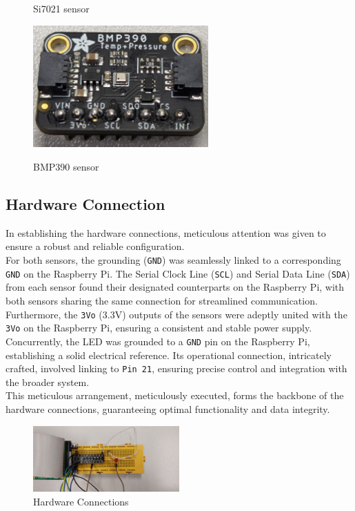 \documentclass[titlepage]{article}
\begin{document}
\begin{figure}[ht]
\begin{minipage}{0.3\textwidth}
        \caption{Si7021 sensor}
        \label{fig:Si7021}
        \vspace{1em}
        \includegraphics[width=0.6\textwidth]{img/BMP390.jpg}
        \caption{BMP390 sensor}
        \label{fig:BMP390}
    \end{minipage}
\end{figure}


\subsection{Hardware Connection}
In establishing the hardware connections, meticulous attention was given to ensure a robust and reliable configuration.\\
For both sensors, the grounding (\texttt{GND}) was seamlessly linked to a corresponding \texttt{GND} on the Raspberry Pi. 
The Serial Clock Line (\texttt{SCL}) and Serial Data Line (\texttt{SDA}) from each sensor found their designated counterparts on the Raspberry Pi, with both sensors sharing the same connection for streamlined communication. 
Furthermore, the \texttt{3Vo} (3.3V) outputs of the sensors were adeptly united with the \texttt{3Vo} on the Raspberry Pi, ensuring a consistent and stable power supply.\\
Concurrently, the LED was grounded to a \texttt{GND} pin on the Raspberry Pi, establishing a solid electrical reference. 
Its operational connection, intricately crafted, involved linking to \texttt{Pin 21}, ensuring precise control and integration with the broader system.\\
This meticulous arrangement, meticulously executed, forms the backbone of the hardware connections, guaranteeing optimal functionality and data integrity.

\begin{figure}[ht]
    \centering
    \includegraphics[width=0.5\textwidth]{img/cabels.jpg}
    \caption{Hardware Connections}
    \label{fig:cabels}
\end{figure}
\end{document}
